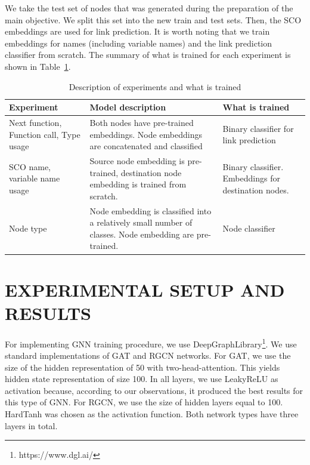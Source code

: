 \documentclass[a4paper,twoside]{article}
\begin{document}
We take the test set of nodes that was generated during the preparation of the main objective. We split this set into the new train and test sets. Then, the SCO embeddings are used for link prediction. It is worth noting that we train embeddings for names (including variable names) and the link prediction classifier from scratch. The summary of what is trained for each experiment is shown in Table~\ref{tbl:experiment_desc}.

\begin{table}
    \centering
    \caption{Description of experiments and what is trained}\label{tbl:experiment_desc}
    \begin{tabular}{p{3cm}p{6cm}p{5cm}}
    \toprule
        \textbf{Experiment} & \textbf{Model description} & \textbf{What is trained} \\ \midrule
        Next function, Function call, Type usage & Both nodes have pre-trained embeddings. Node embeddings are concatenated and classified & Binary classifier for link prediction \\ \midrule
        SCO name, variable name usage & Source node embedding is pre-trained, destination node embedding is trained from scratch. & Binary classifier. Embeddings for destination nodes. \\ \midrule
        Node type & Node embedding is classified into a relatively small number of classes. Node embedding are pre-trained. & Node classifier \\ \bottomrule
    \end{tabular}
\end{table}



\section{\uppercase{Experimental Setup and Results}}\label{sec:setup}

For implementing GNN training procedure, we use DeepGraphLibrary\footnote{https://www.dgl.ai/}. We use standard implementations of GAT and RGCN networks. For GAT, we use the size of the hidden representation of 50 with two-head-attention. This yields hidden state representation of size 100. In all layers, we use LeakyReLU as activation because, according to our observations, it produced the best results for this type of GNN\@. For RGCN, we use the size of hidden layers equal to 100. HardTanh was chosen as the activation function. Both network types have three layers in total. 
\end{document}
